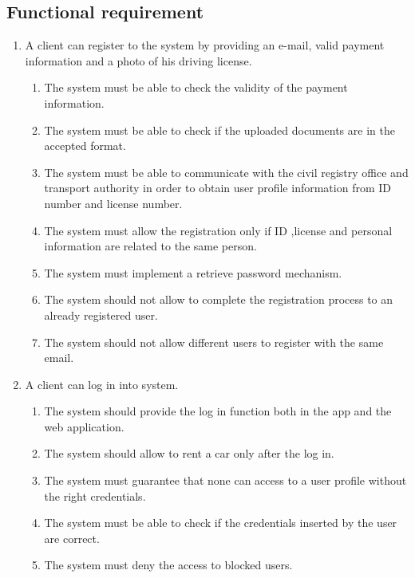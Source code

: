 \subsection{Functional requirement}
\begin{enumerate}
\item A client can register to the system by providing an e-mail, valid payment information and a photo of his driving license.
\begin{enumerate}
\item The system must be able to check the validity of the payment information.
\item The system must be able to check if the uploaded documents are in the accepted format.
\item The system must be able to communicate with the civil registry office and transport authority in order to obtain user profile information from ID number and license number. 
\item The system must allow the registration only if ID ,license and personal information are related to the same person.
\item The system must implement a retrieve password mechanism.
\item The system should not allow to complete the registration process to an already registered user.
\item The system should not allow different users to register with the same email.
\end{enumerate}

\item A client can log in into system.
\begin{enumerate}
\item The system should provide the log in function both in the app and the web application.
\item The system should allow to rent a car only after the log in.
\item The system must guarantee that none can access to a user profile without the right credentials.
\item The system must be able to check if the credentials inserted by the user are correct.
\item The system must deny the access to blocked users.
\end{enumerate}


\end{enumerate}

